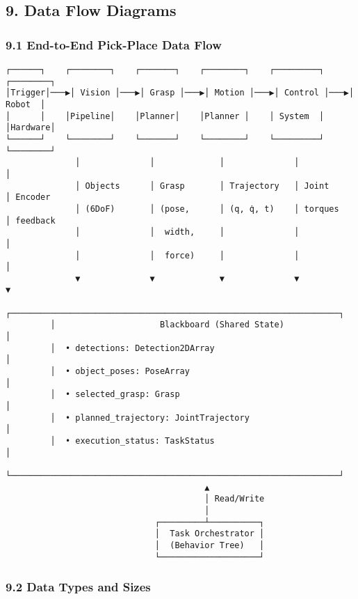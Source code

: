 \documentclass[
]{article}
\begin{document}
\hypertarget{data-flow-diagrams}{%
\subsection{9. Data Flow Diagrams}\label{data-flow-diagrams}}

\hypertarget{end-to-end-pick-place-data-flow}{%
\subsubsection{9.1 End-to-End Pick-Place Data
Flow}\label{end-to-end-pick-place-data-flow}}

\begin{verbatim}
┌──────┐    ┌────────┐    ┌───────┐    ┌────────┐    ┌─────────┐    ┌────────┐
│Trigger│───▶│ Vision │───▶│ Grasp │───▶│ Motion │───▶│ Control │───▶│ Robot  │
│      │    │Pipeline│    │Planner│    │Planner │    │ System  │    │Hardware│
└──────┘    └────────┘    └───────┘    └────────┘    └─────────┘    └────────┘
              │              │             │              │              │
              │ Objects      │ Grasp       │ Trajectory   │ Joint        │ Encoder
              │ (6DoF)       │ (pose,      │ (q, q̇, t)    │ torques      │ feedback
              │              │  width,     │              │              │
              │              │  force)     │              │              │
              ▼              ▼             ▼              ▼              ▼
         ┌──────────────────────────────────────────────────────────────────┐
         │                     Blackboard (Shared State)                    │
         │  • detections: Detection2DArray                                  │
         │  • object_poses: PoseArray                                       │
         │  • selected_grasp: Grasp                                         │
         │  • planned_trajectory: JointTrajectory                           │
         │  • execution_status: TaskStatus                                  │
         └──────────────────────────────────────────────────────────────────┘
                                        ▲
                                        │ Read/Write
                                        │
                              ┌─────────┴──────────┐
                              │  Task Orchestrator │
                              │  (Behavior Tree)   │
                              └────────────────────┘
\end{verbatim}

\hypertarget{data-types-and-sizes}{%
\subsubsection{9.2 Data Types and Sizes}\label{data-types-and-sizes}}
\end{document}
